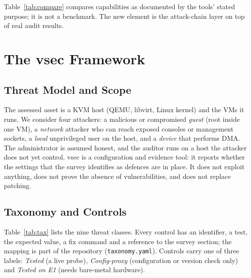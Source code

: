 \documentclass[conference]{IEEEtran}
\begin{document}
Table~\ref{tab:compare} compares capabilities as documented by the tools' stated purpose; it is not a benchmark. The new element is the attack-chain layer on top of real audit results.

\section{The vsec Framework}
\subsection{Threat Model and Scope}
The assessed asset is a KVM host (QEMU, libvirt, Linux kernel) and the VMs it runs. We consider four attackers: a malicious or compromised \emph{guest} (root inside one VM), a \emph{network} attacker who can reach exposed consoles or management sockets, a \emph{local} unprivileged user on the host, and a \emph{device} that performs DMA. The administrator is assumed honest, and the auditor runs on a host the attacker does not yet control. vsec is a configuration and evidence tool: it reports whether the settings that the survey identifies as defences are in place. It does not exploit anything, does not prove the absence of vulnerabilities, and does not replace patching.

\subsection{Taxonomy and Controls}
Table~\ref{tab:tax} lists the nine threat classes. Every control has an identifier, a test, the expected value, a fix command and a reference to the survey section; the mapping is part of the repository (\texttt{taxonomy.yaml}). Controls carry one of three labels: \emph{Tested} (a live probe), \emph{Config-proxy} (configuration or version check only) and \emph{Tested on E1} (needs bare-metal hardware).
\end{document}

